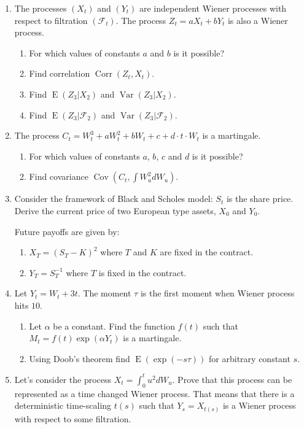 \documentclass[12pt]{article}
\DeclareMathOperator{\Cov}{Cov}
\DeclareMathOperator{\Corr}{Corr}
\DeclareMathOperator{\Var}{Var}
\DeclareMathOperator{\E}{E}
\begin{document}
\begin{enumerate}

\item The processes $(X_t)$ and $(Y_t)$ are independent Wiener processes with respect to filtration $(\mathcal{F}_t)$.
The process $Z_t = aX_t + b Y_t$ is also a Wiener process. 
\begin{enumerate}
  \item For which values of constants $a$ and $b$ is it possible?
  \item Find correlation $\Corr(Z_t, X_t)$.
  \item Find $\E(Z_3 | X_2)$ and $\Var(Z_3 | X_2)$.
  \item Find $\E(Z_3 | \mathcal{F}_2)$ and $\Var(Z_3 | \mathcal{F}_2)$.
\end{enumerate}


\item The process $C_t = W_t^3 + aW_t^2 +b W_t + c + d\cdot t\cdot W_t$ is a martingale.
\begin{enumerate}
  \item For which values of constants $a$, $b$, $c$ and $d$ is it possible?
  \item Find covariance $\Cov(C_t, \int W^2_u dW_u)$.
\end{enumerate}

\item Consider the framework of Black and Scholes model: $S_t$ is the share price. 
Derive the current price of two European type assets, $X_0$ and $Y_0$. 

Future payoffs are given by:
\begin{enumerate}
  \item $X_T = (S_T - K)^2$ where $T$ and $K$ are fixed in the contract.
  \item $Y_T = S_T^{-1}$ where $T$ is fixed in the contract. 
\end{enumerate}

\item Let $Y_t = W_t + 3t$. The moment $\tau$ is the first moment when Wiener process hits $10$. 
\begin{enumerate}
  \item Let $\alpha$ be a constant. Find the function $f(t)$ such that $M_t = f(t)\exp(\alpha Y_t)$ is a martingale.
  \item Using Doob's theorem find $\E(\exp(-s \tau))$ for arbitrary constant $s$. 
\end{enumerate}

\item Let's consider the process $X_t = \int_0^t u^2 dW_u$. 
Prove that this process can be represented as a time changed Wiener process. 
That means that there is a deterministic time-scaling $t(s)$ 
such that $Y_s = X_{t(s)}$ is a Wiener process with respect to some filtration. 


\end{enumerate}
\end{document}
